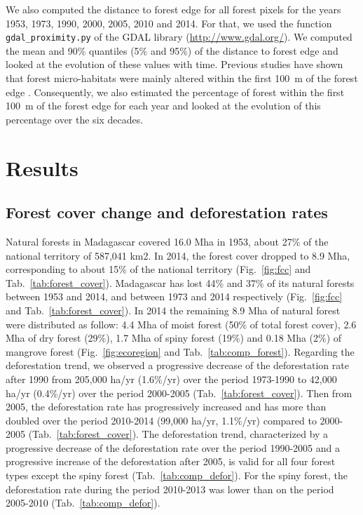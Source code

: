 \documentclass[a4paper, 12pt, leqno]{article}\usepackage[]{graphicx}\usepackage[]{color}
\begin{document}
We also computed the distance to forest edge for all forest
pixels for the years 1953, 1973, 1990, 2000, 2005, 2010 and 2014. For
that, we used the function \texttt{gdal\_proximity.py} of the GDAL
library (\url{http://www.gdal.org/}). We computed the mean and 90\%
quantiles (5\% and 95\%) of the distance to forest edge and looked at
the evolution of these values with time. Previous studies have shown
that forest micro-habitats were mainly altered within the first 100~m
of the forest edge \citep{Brinck2017, Gibson2013, Murcia1995,
  Broadbent2008}. Consequently, we also estimated the percentage of
forest within the first 100~m of the forest edge for each year and
looked at the evolution of this percentage over the six decades.

\newpage

\section{Results}
\label{results}

\subsection{Forest cover change and deforestation rates}

Natural forests in Madagascar covered 16.0 Mha in 1953, about 27\% of
the national territory of 587,041 km2. In 2014, the forest cover
dropped to 8.9 Mha, corresponding to about 15\% of the national
territory (Fig.~\ref{fig:fcc} and
Tab.~\ref{tab:forest_cover}). Madagascar has lost 44\% and 37\% of its
natural forests between 1953 and 2014, and between 1973 and 2014
respectively (Fig.~\ref{fig:fcc} and Tab.~\ref{tab:forest_cover}). In
2014 the remaining 8.9 Mha of natural forest were distributed as
follow: 4.4 Mha of moist forest (50\% of total forest cover), 2.6 Mha
of dry forest (29\%), 1.7 Mha of spiny forest (19\%) and 0.18 Mha
(2\%) of mangrove forest (Fig.~\ref{fig:ecoregion} and
Tab.~\ref{tab:comp_forest}). Regarding the deforestation trend, we
observed a progressive decrease of the deforestation rate after 1990
from 205,000 ha/yr (1.6\%/yr) over the period 1973-1990 to 42,000
ha/yr (0.4\%/yr) over the period 2000-2005
(Tab.~\ref{tab:forest_cover}). Then from 2005, the deforestation rate
has progressively increased and has more than doubled over the period
2010-2014 (99,000 ha/yr, 1.1\%/yr) compared to 2000-2005
(Tab.~\ref{tab:forest_cover}). The deforestation trend, characterized
by a progressive decrease of the deforestation rate over the period
1990-2005 and a progressive increase of the deforestation after 2005,
is valid for all four forest types except the spiny forest
(Tab.~\ref{tab:comp_defor}). For the spiny forest, the deforestation
rate during the period 2010-2013 was lower than on the period
2005-2010 (Tab.~\ref{tab:comp_defor}).
\end{document}
